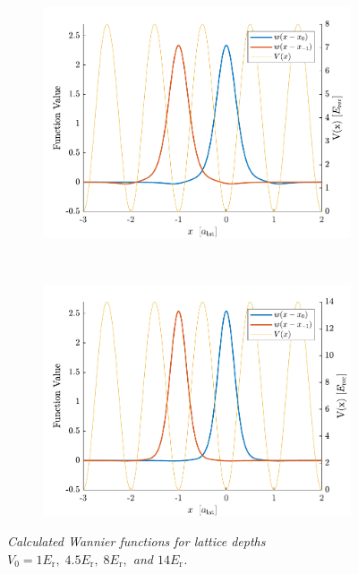 \begin{figure}[t]
\begin{subfigure}[t]{0.49\textwidth}
        \includegraphics[width=\textwidth]{Figures/WannierPlot3.pdf}
    \end{subfigure}
    ~
    \begin{subfigure}[t]{0.49\textwidth}
        \includegraphics[width=\textwidth]{Figures/WannierPlot4.pdf}
	\end{subfigure}
	\caption{\textit{Calculated Wannier functions for lattice depths $V_0 = 1 E_{\mathrm{r}} , \; 4.5 E_{\mathrm{r}} , \; 8 E_{\mathrm{r}} ,$ and $14 E_{\mathrm{r}}$.}}
	\label{fig:numWannier}    
\end{figure}
